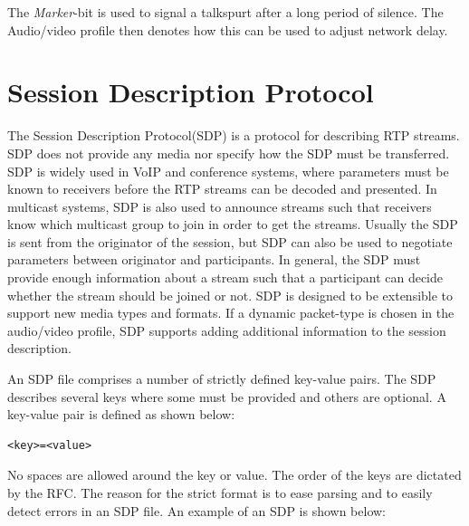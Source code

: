 The \textit{Marker}-bit is used to signal a talkspurt after a long period of silence. The Audio/video profile then denotes how this can be used to adjust network delay.

\section{Session Description Protocol} \label{sec:design:sdp}
The Session Description Protocol(SDP) is a protocol for describing RTP streams.
SDP does not provide any media nor specify how the SDP must be transferred.
SDP is widely used in VoIP and conference systems, where parameters must be known to receivers before the RTP streams can be decoded and presented. In multicast systems, SDP is also used to announce streams such that receivers know which multicast group to join in order to get the streams. Usually the SDP is sent from the originator of the session, but SDP can also be used to negotiate parameters between originator and participants. In general, the SDP must provide enough information about a stream such that a participant can decide whether the stream should be joined or not.  SDP is designed to be extensible to support new media types and formats. If a dynamic packet-type is chosen in the audio/video profile, SDP supports adding additional information to the session description. 

An SDP file comprises a number of strictly defined key-value pairs. The SDP describes several keys where some must be provided and others are optional. A key-value pair is defined as shown below:
\begin{verbatim}
<key>=<value>
\end{verbatim}

No spaces are allowed around the key or value.
The order of the keys are dictated by the RFC. The reason for the strict format is to ease parsing and to easily detect errors in an SDP file. An example of an SDP is shown below:

